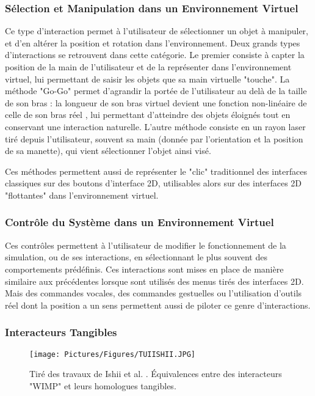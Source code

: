 	\subsubsection{Sélection et Manipulation dans un Environnement Virtuel}
	Ce type d'interaction permet à l'utilisateur de sélectionner un objet à manipuler, et d'en altérer la position et rotation dans l'environnement. Deux grands types d'interactions se retrouvent dans cette catégorie. Le premier consiste à capter la position de la main de l'utilisateur et de la représenter dans l'environnement virtuel, lui permettant de saisir les objets que sa main virtuelle "touche". La méthode "Go-Go" permet d'agrandir la portée de l'utilisateur au delà de la taille de son bras : la longueur de son bras virtuel devient une fonction non-linéaire de celle de son bras réel \cite{poupyrev_go-go_1996}, lui permettant d'atteindre des objets éloignés tout en conservant une interaction naturelle. L'autre méthode consiste en un rayon laser tiré depuis l'utilisateur, souvent sa main (donnée par l'orientation et la position de sa manette), qui vient sélectionner l'objet ainsi visé. 
	
	Ces méthodes permettent aussi de représenter le "clic" traditionnel des interfaces classiques sur des boutons d'interface 2D, utilisables alors sur des interfaces 2D "flottantes" dans l'environnement virtuel.
	
	\subsubsection{Contrôle du Système dans un Environnement Virtuel}
	Ces contrôles permettent à l'utilisateur de modifier le fonctionnement de la simulation, ou de ses interactions, en sélectionnant le plus souvent des comportements prédéfinis. Ces interactions sont mises en place de manière similaire aux précédentes lorsque sont utilisés des menus tirés des interfaces 2D. Mais des commandes vocales, des commandes gestuelles ou l'utilisation d'outils réel dont la position a un sens permettent aussi de piloter ce genre d'interactions.
	
	
	\subsubsection{Interacteurs Tangibles}
	
		\begin{figure}
			\centering
			\texttt{[image: Pictures/Figures/TUIISHII.JPG]}
			\caption{Tiré des travaux de Ishii et al. \cite{ishii_tangible_1997}. Équivalences entre des interacteurs "WIMP" et leurs homologues tangibles.}
			\label{TUIEx}
		\end{figure}	
	
